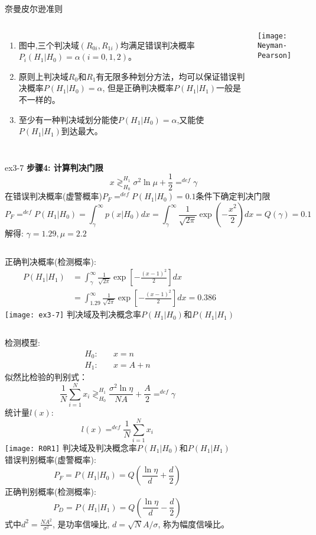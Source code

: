 \begin{frame}{奈曼皮尔逊准则}
\begin{columns}
	\begin{enumerate}
		\item 图中,三个判决域$(R_{0i},R_{1i})$均满足错误判决概率$P_i(H_1|H_0)=\alpha(i=0,1,2)$。
		\item 原则上判决域$R_0$和$R_1$有无限多种划分方法，均可以保证错误判决概率$P(H_1|H_0)=\alpha$, 但是正确判决概率$P(H_1|H_1)$一般是不一样的。
		\item 至少有一种判决域划分能使$P(H_1|H_0)=\alpha$,又能使$P(H_1|H_1)$到达最大。
	\end{enumerate}
	\texttt{[image: Neyman-Pearson]}
\end{columns}
\end{frame}

\begin{frame}{ex3-7}
\textbf{步骤4: 计算判决门限}
\[x\mathop{\gtrless}_{H_0}^{H_1}\sigma^2\ln\mu+\frac{1}{2}\mathop{=}^{def}\gamma \]
在错误判决概率(虚警概率)$P_F\mathop{=}^{def}P(H_1|H_0)=0.1$条件下确定判决门限
\[ P_F\mathop{=}^{def}P(H_1|H_0)=\int_{\gamma}^{\infty}p(x|H_0)dx=\int_{\gamma}^{\infty}\frac{1}{\sqrt{2\pi}}\exp\left(-\frac{x^2}{2}\right)dx=Q(\gamma)=0.1 \]
解得: $\gamma=1.29,\mu=2.2$\\
\begin{columns}
	正确判决概率(检测概率):
	\begin{align*}
	P(H_1|H_1)&=\int_{\gamma}^{\infty}\frac{1}{\sqrt{2\pi}}\exp\left[-\frac{(x-1)^2}{2}\right]dx\\
	&=\int_{1.29}^{\infty}\frac{1}{\sqrt{2\pi}}\exp\left[-\frac{(x-1)^2}{2}\right]dx=0.386
	\end{align*}
	\texttt{[image: ex3-7]}
	\scriptsize
	判决域及判决概念率$P(H_1|H_0)$和$P(H_1|H_1)$
\end{columns}
\end{frame}

\begin{frame}[shrink]
\begin{columns}
	检测模型:
	\begin{align*}
	H_0:\quad&x=n\\
	H_1:\quad&x=A+n
	\end{align*}
	似然比检验的判别式：
	\[\frac{1}{N}\sum_{i=1}^{N}x_i\mathop{\gtrless}_{H_0}^{H_1}\frac{\sigma^2\ln\eta}{NA}+\frac{A}{2}\mathop
	{=}^{def}\gamma \]
	统计量$l(x)$:
	\[l(x)\mathop{=}^{def}\frac{1}{N}\sum_{i=1}^{N}x_i \]
	\texttt{[image: R0R1]}
	\scriptsize
	判决域及判决概念率$P(H_1|H_0)$和$P(H_1|H_1)$\\
	\normalsize
	错误判别概率(虚警概率):
	\[P_F=P(H_1|H_0)=Q\left(\frac{\ln\eta}{d}+\frac{d}{2}\right)\]
	正确判别概率(检测概率):
	\[P_D=P(H_1|H_1)=Q\left(\frac{\ln\eta}{d}-\frac{d}{2}\right)\]
	式中$d^2=\frac{NA^2}{\sigma^2}$, 是功率信噪比, $d=\sqrt{N}A/\sigma$, 称为幅度信噪比。
\end{columns}
\end{frame}

